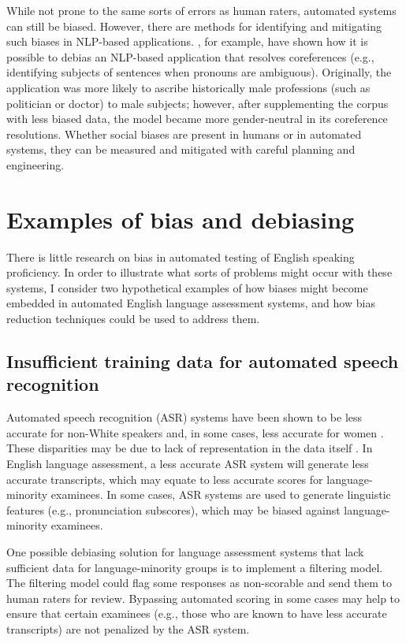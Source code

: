 \documentclass [PhD] {uclathes}
\begin{document}
While not prone to the same sorts of errors as human raters, automated systems can still be biased. However, there are methods for identifying and mitigating such biases in NLP-based applications. \citet{zhao2018gender}, for example, have shown how it is possible to debias an NLP-based application that resolves coreferences (e.g., identifying subjects of sentences when pronouns are ambiguous). Originally, the application was more likely to ascribe historically male professions (such as politician or doctor) to male subjects; however, after supplementing the corpus with less biased data, the model became more gender-neutral in its coreference resolutions. Whether social biases are present in humans or in automated systems, they can be measured and mitigated with careful planning and engineering.

\section{Examples of bias and debiasing}

There is little research on bias in automated testing of English speaking proficiency. In order to illustrate what sorts of problems might occur with these systems, I consider two hypothetical examples of how biases might become embedded in automated English language assessment systems, and how bias reduction techniques could be used to address them.

\subsection{Insufficient training data for automated speech recognition}

Automated speech recognition (ASR) systems have been shown to be less accurate for non-White speakers \citep{koenecke2020} and, in some cases, less accurate for women \citep{tatman2017a, tatman2017b}. These disparities may be due to lack of representation in the data itself \citep[e.g.][]{zhao2018gender}. In English language assessment, a less accurate ASR system will generate less accurate transcripts, which may equate to less accurate scores for language-minority examinees. In some cases, ASR systems are used to generate linguistic features (e.g., pronunciation subscores), which may be biased against language-minority examinees.

One possible debiasing solution for language assessment systems that lack sufficient data for language-minority groups is to implement a filtering model. The filtering model could flag some responses as non-scorable and send them to human raters for review. Bypassing automated scoring in some cases may help to ensure that certain examinees (e.g., those who are known to have less accurate transcripts) are not penalized by the ASR system.
\end{document}
